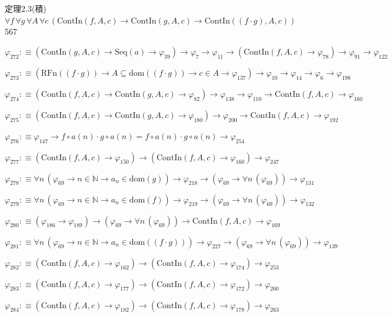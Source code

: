 \begin{fullproof}{定理2.3(積)}{$\forall f\,\forall g\,\forall A\,\forall c\,(\mathrm{ContIn}(f,A,c) \to \mathrm{ContIn}(g,A,c) \to \mathrm{ContIn}((f \cdot g),A,c))$}{567}
\begin{abbrevlist}
\item $\varphi_{272} :\equiv (\mathrm{ContIn}(g,A,c) \to \mathrm{Seq}(a) \to \varphi_{39}) \to \varphi_{7} \to \varphi_{11} \to (\mathrm{ContIn}(f,A,c) \to \varphi_{78}) \to \varphi_{91} \to \varphi_{122}$
\item $\varphi_{273} :\equiv (\mathrm{RFn}((f \cdot g)) \to A \subseteq \mathrm{dom}((f \cdot g)) \to c \in A \to \varphi_{137}) \to \varphi_{10} \to \varphi_{14} \to \varphi_{6} \to \varphi_{198}$
\item $\varphi_{274} :\equiv (\mathrm{ContIn}(f,A,c) \to \mathrm{ContIn}(g,A,c) \to \varphi_{82}) \to \varphi_{138} \to \varphi_{110} \to \mathrm{ContIn}(f,A,c) \to \varphi_{160}$
\item $\varphi_{275} :\equiv (\mathrm{ContIn}(f,A,c) \to \mathrm{ContIn}(g,A,c) \to \varphi_{180}) \to \varphi_{200} \to \mathrm{ContIn}(f,A,c) \to \varphi_{192}$
\item $\varphi_{276} :\equiv \varphi_{147} \to f \circ a(n) \cdot g \circ a(n) = f \circ a(n) \cdot g \circ a(n) \to \varphi_{254}$
\item $\varphi_{277} :\equiv (\mathrm{ContIn}(f,A,c) \to \varphi_{150}) \to (\mathrm{ContIn}(f,A,c) \to \varphi_{160}) \to \varphi_{247}$
\item $\varphi_{278} :\equiv \forall n\,(\varphi_{69} \to n \in \mathbb{N} \to a_{n} \in \mathrm{dom}(g)) \to \varphi_{218} \to (\varphi_{69} \to \forall n\,(\varphi_{69})) \to \varphi_{131}$
\item $\varphi_{279} :\equiv \forall n\,(\varphi_{69} \to n \in \mathbb{N} \to a_{n} \in \mathrm{dom}(f)) \to \varphi_{219} \to (\varphi_{69} \to \forall n\,(\varphi_{69})) \to \varphi_{132}$
\item $\varphi_{280} :\equiv (\varphi_{186} \to \varphi_{189}) \to (\varphi_{69} \to \forall n\,(\varphi_{69})) \to \mathrm{ContIn}(f,A,c) \to \varphi_{169}$
\item $\varphi_{281} :\equiv \forall n\,(\varphi_{69} \to n \in \mathbb{N} \to a_{n} \in \mathrm{dom}((f \cdot g))) \to \varphi_{227} \to (\varphi_{69} \to \forall n\,(\varphi_{69})) \to \varphi_{139}$
\item $\varphi_{282} :\equiv (\mathrm{ContIn}(f,A,c) \to \varphi_{162}) \to (\mathrm{ContIn}(f,A,c) \to \varphi_{174}) \to \varphi_{253}$
\item $\varphi_{283} :\equiv (\mathrm{ContIn}(f,A,c) \to \varphi_{177}) \to (\mathrm{ContIn}(f,A,c) \to \varphi_{172}) \to \varphi_{260}$
\item $\varphi_{284} :\equiv (\mathrm{ContIn}(f,A,c) \to \varphi_{182}) \to (\mathrm{ContIn}(f,A,c) \to \varphi_{178}) \to \varphi_{263}$
\end{abbrevlist}
\end{fullproof}
